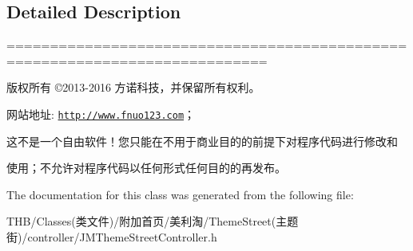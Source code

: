 \subsection{Detailed Description}
============================================================================

版权所有 ©2013-\/2016 方诺科技，并保留所有权利。

网站地址\+: \href{http://www.fnuo123.com}{\tt http\+://www.\+fnuo123.\+com}； 



这不是一个自由软件！您只能在不用于商业目的的前提下对程序代码进行修改和

使用；不允许对程序代码以任何形式任何目的的再发布。 

 

The documentation for this class was generated from the following file\+:\begin{DoxyCompactItemize}
\item 
T\+H\+B/\+Classes(类文件)/附加首页/美利淘/\+Theme\+Street(主题街)/controller/J\+M\+Theme\+Street\+Controller.\+h\end{DoxyCompactItemize}
